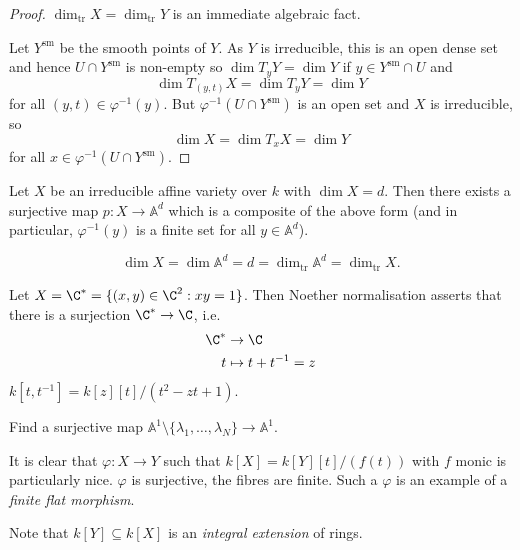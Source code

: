 \documentclass[a4paper]{article}
\renewcommand{\A}{\mathbb{A}}
\begin{document}
\begin{proof}
  \(\dim_{\text{tr}} X = \dim_{\text{tr}} Y\) is an immediate algebraic fact.

  Let \(Y^{\text{sm}}\) be the smooth points of \(Y\). As \(Y\) is irreducible, this is an open dense set and hence \(U \cap Y^{\text{sm}}\) is non-empty so \(\dim T_y Y = \dim Y\) if \(y \in Y^{\text{sm}} \cap U\) and
  \[
    \dim T_{(y, t)}X = \dim T_yY = \dim Y
  \]
  for all \((y, t) \in \varphi^{-1}(y)\). But \(\varphi^{-1}(U \cap Y^{\text{sm}})\) is an open set and \(X\) is irreducible, so
  \[
    \dim X = \dim T_xX = \dim Y
  \]
  for all \(x \in \varphi^{-1}(U \cap Y^{\text{sm}})\).
\end{proof}

\begin{theorem}
  Let \(X\) be an irreducible affine variety over \(k\) with \(\dim X = d\). Then there exists a surjective map \(p: X \to \A^d\) which is a composite of the above form (and in particular, \(\varphi^{-1}(y)\) is a finite set for all \(y \in \A^d\)).
\end{theorem}

\begin{corollary}
  \[
    \dim X = \dim \A^d = d = \dim_{\text{tr}} \A^d = \dim_{\text{tr}} X.
  \]
\end{corollary}

\begin{eg}
  Let \(X = \C^* = \{(x, y) \in \C^2: xy = 1\}\). Then Noether normalisation asserts that there is a surjection \(\C^* \to \C\), i.e.
  \begin{align*}
    \C^* &\to \C \\
    t &\mapsto t + t^{-1} = z
  \end{align*}
  \(k[t, t^{-1}] = k[z][t]/(t^2 - zt + 1)\).
\end{eg}

\begin{ex}
  Find a surjective map \(\A^1 \setminus \{\lambda_1, \dots, \lambda_N\} \to \A^1\).
\end{ex}

It is clear that \(\varphi: X \to Y\) such that \(k[X] = k[Y][t]/(f(t))\) with \(f\) monic is particularly nice. \(\varphi\) is surjective, the fibres are finite. Such a \(\varphi\) is an example of a \emph{finite flat morphism}.

Note that \(k[Y] \subseteq k[X]\) is an \emph{integral extension} of rings.
\end{document}

